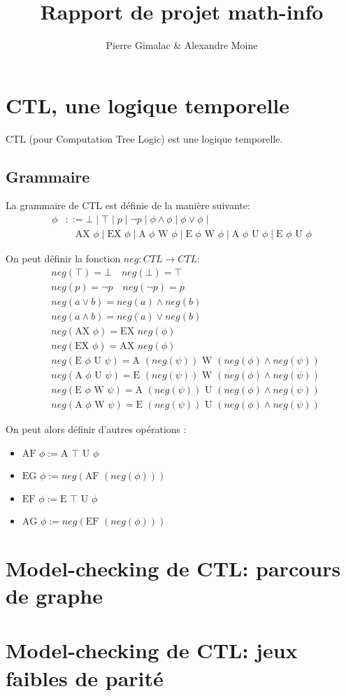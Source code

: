 \documentclass[10pt,a4paper]{article}
\author{Pierre Gimalac \& Alexandre Moine}
\title{Rapport de projet math-info}
\begin{document}
\maketitle

\section{CTL, une logique temporelle}
CTL (pour Computation Tree Logic) est une logique temporelle.

\subsection{Grammaire}
La grammaire de CTL est définie de la manière suivante:
\begin{align*}
\phi &::= \bot \mid \top \mid p \mid \neg p \mid \phi\land\phi \mid \phi\lor\phi \mid \\
&\quad \mbox{AX }\phi \mid \mbox{EX }\phi \mid
\mbox{A }\phi \mbox{ W } \phi \mid \mbox{E }\phi \mbox{ W } \phi \mid
\mbox{A }\phi \mbox{ U } \phi \mid \mbox{E }\phi \mbox{ U } \phi
\end{align*}

On peut définir la fonction $neg:CTL \to CTL$:
\begin{align*}
&neg(\top) = \bot \quad neg(\bot) = \top\\
&neg(p) = \neg p \quad neg(\neg p) = p\\
&neg(a \lor b) = neg(a) \land neg(b)\\
&neg(a \land b) = neg(a) \lor neg(b)\\
&neg(\mbox{AX } \phi) = \mbox{EX }neg(\phi)\\
&neg(\mbox{EX } \phi) = \mbox{AX }neg(\phi)\\
&neg(\mbox{E } \phi \mbox{ U } \psi) =\mbox{A } (neg(\psi)) \mbox{ W } (neg(\phi) \land neg(\psi))\\
&neg(\mbox{A } \phi \mbox{ U } \psi) =\mbox{E } (neg(\psi)) \mbox{ W } (neg(\phi) \land neg(\psi))\\
&neg(\mbox{E } \phi \mbox{ W } \psi) =\mbox{A } (neg(\psi)) \mbox{ U } (neg(\phi) \land neg(\psi))\\
&neg(\mbox{A } \phi \mbox{ W } \psi) =\mbox{E } (neg(\psi)) \mbox{ U } (neg(\phi) \land neg(\psi))
\end{align*}

On peut alors définir d'autres opérations :
\begin{itemize}
	\item $\mbox{AF } \phi := \mbox{A } \top \mbox{ U } \phi$
	\item $\mbox{EG } \phi := neg(\mbox{AF } (neg (\phi)))$
	\item $\mbox{EF } \phi := \mbox{E } \top \mbox{ U } \phi$
	\item $\mbox{AG } \phi := neg(\mbox{EF } (neg (\phi)))$
\end{itemize}

\section{Model-checking de CTL: parcours de graphe}

\section{Model-checking de CTL: jeux faibles de parité}
\end{document}
